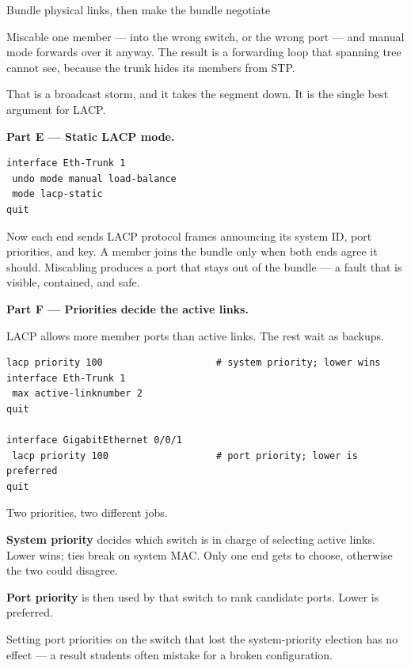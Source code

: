 \begin{labproject}{Bundle physical links, then make the bundle negotiate}
\begin{keyidea}
Miscable one member --- into the wrong switch, or the wrong port --- and manual mode forwards over it anyway. The result is a forwarding loop that spanning tree cannot see, because the trunk hides its members from STP.

That is a broadcast storm, and it takes the segment down. It is the single best argument for LACP.
\end{keyidea}

\medskip\noindent\textbf{Part E --- Static LACP mode.}\par

\begin{lstlisting}[style=utpterminal]
interface Eth-Trunk 1
 undo mode manual load-balance
 mode lacp-static
quit
\end{lstlisting}

Now each end sends LACP protocol frames announcing its system ID, port priorities, and key. A member joins the bundle only when both ends agree it should. Miscabling produces a port that stays out of the bundle --- a fault that is visible, contained, and safe.

\medskip\noindent\textbf{Part F --- Priorities decide the active links.}\par
LACP allows more member ports than active links. The rest wait as backups.

\begin{lstlisting}[style=utpterminal]
lacp priority 100                    # system priority; lower wins
interface Eth-Trunk 1
 max active-linknumber 2
quit

interface GigabitEthernet 0/0/1
 lacp priority 100                   # port priority; lower is preferred
quit
\end{lstlisting}

\begin{keyidea}
Two priorities, two different jobs.

\textbf{System priority} decides which switch is in charge of selecting active links. Lower wins; ties break on system MAC. Only one end gets to choose, otherwise the two could disagree.

\textbf{Port priority} is then used by that switch to rank candidate ports. Lower is preferred.

Setting port priorities on the switch that lost the system-priority election has no effect --- a result students often mistake for a broken configuration.
\end{keyidea}


\end{labproject}
